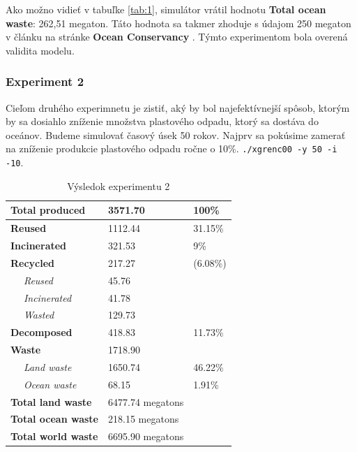 \documentclass[a4paper, 11pt]{article}
\begin{document}
Ako možno vidieť v tabuľke \ref{tab:1}, simulátor vrátil hodnotu \textbf{Total ocean waste}: 262,51 megaton. Táto hodnota sa takmer zhoduje s údajom 250 megaton v článku na stránke \textbf{Ocean Conservancy} \cite{ocean_conservancy}. Týmto experimentom bola overená validita modelu.

\subsubsection{Experiment 2}
\label{label:exp2}

Cieľom druhého experimnetu je zistiť, aký by bol najefektívnejší spôsob, ktorým by sa dosiahlo zníženie množstva plastového odpadu, ktorý sa dostáva do oceánov.
Budeme simulovať časový úsek 50 rokov. Najprv sa pokúsime zamerať na zníženie produkcie plastového odpadu ročne o 10\%.
\texttt{./xgrenc00 -y 50 -i -10}.

\begin{table}[ht]
	\centering
	\begin{tabular}{|l|l|l|l|}
		\hline
		\multicolumn{2}{|l|}{\textbf{Total produced}}    & 3571.70              & 100\%              \\ \hline
		\multicolumn{2}{|l|}{\textbf{Reused}}            & 1112.44              & 31.15\%            \\ \hline
		\multicolumn{2}{|l|}{\textbf{Incinerated}}       & 321.53               & 9\%                \\ \hline
		\multicolumn{2}{|l|}{\textbf{Recycled}}          & 217.27               & (6.08\%)           \\ \hline
		                                                 & \textit{Reused}      & 45.76    &         \\ \hline
		                                                 & \textit{Incinerated} & 41.78    &         \\ \hline
		                                                 & \textit{Wasted}      & 129.73   &         \\ \hline
		\multicolumn{2}{|l|}{\textbf{Decomposed}}        & 418.83               & 11.73\%            \\ \hline
		\multicolumn{2}{|l|}{\textbf{Waste}}             & 1718.90              &                    \\ \hline
		                                                 & \textit{Land waste}  & 1650.74  & 46.22\% \\ \hline
		                                                 & \textit{Ocean waste} & 68.15    & 1.91\%  \\ \hline
		\multicolumn{2}{|l|}{\textbf{Total land waste}}  & 6477.74 megatons     &                    \\ \hline
		\multicolumn{2}{|l|}{\textbf{Total ocean waste}} & 218.15 megatons      &                    \\ \hline
		\multicolumn{2}{|l|}{\textbf{Total world waste}} & 6695.90 megatons     &                    \\ \hline
	\end{tabular}
	\caption{Výsledok experimentu 2}
	\label{tab:2}
\end{table}
\end{document}
